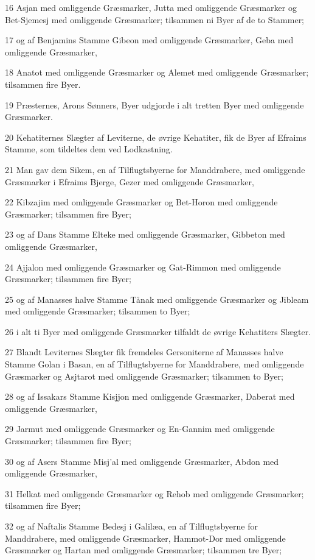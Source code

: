 \par 16 Asjan med omliggende Græsmarker, Jutta med omliggende Græsmarker og Bet-Sjemesj med omliggende Græsmarker; tilsammen ni Byer af de to Stammer;
\par 17 og af Benjamins Stamme Gibeon med omliggende Græsmarker, Geba med omliggende Græsmarker,
\par 18 Anatot med omliggende Græsmarker og Alemet med omliggende Græsmarker; tilsammen fire Byer.
\par 19 Præsternes, Arons Sønners, Byer udgjorde i alt tretten Byer med omliggende Græsmarker.
\par 20 Kehatiternes Slægter af Leviterne, de øvrige Kehatiter, fik de Byer af Efraims Stamme, som tildeltes dem ved Lodkastning.
\par 21 Man gav dem Sikem, en af Tilflugtsbyerne for Manddrabere, med omliggende Græsmarker i Efraims Bjerge, Gezer med omliggende Græsmarker,
\par 22 Kibzajim med omliggende Græsmarker og Bet-Horon med omliggende Græsmarker; tilsammen fire Byer;
\par 23 og af Dans Stamme Elteke med omliggende Græsmarker, Gibbeton med omliggende Græsmarker,
\par 24 Ajjalon med omliggende Græsmarker og Gat-Rimmon med omliggende Græsmarker; tilsammen fire Byer;
\par 25 og af Manasses halve Stamme Tånak med omliggende Græsmarker og Jibleam med omliggende Græsmarker; tilsammen to Byer;
\par 26 i alt ti Byer med omliggende Græsmarker tilfaldt de øvrige Kehatiters Slægter.
\par 27 Blandt Leviternes Slægter fik fremdeles Gersoniterne af Manasses halve Stamme Golan i Basan, en af Tilflugtsbyerne for Manddrabere, med omliggende Græsmarker og Asjtarot med omliggende Græsmarker; tilsammen to Byer;
\par 28 og af Issakars Stamme Kisjjon med omliggende Græsmarker, Daberat med omliggende Græsmarker,
\par 29 Jarmut med omliggende Græsmarker og En-Gannim med omliggende Græsmarker; tilsammen fire Byer;
\par 30 og af Asers Stamme Misj'al med omliggende Græsmarker, Abdon med omliggende Græsmarker,
\par 31 Helkat med omliggende Græsmarker og Rehob med omliggende Græsmarker; tilsammen fire Byer;
\par 32 og af Naftalis Stamme Bedesj i Galilæa, en af Tilflugtsbyerne for Manddrabere, med omliggende Græsmarker, Hammot-Dor med omliggende Græsmarker og Hartan med omliggende Græsmarker; tilsammen tre Byer;
